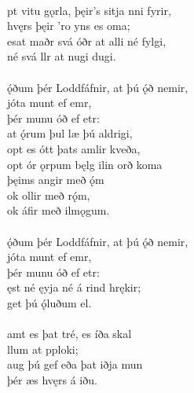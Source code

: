  \\

\bva {}pt vitu gǫrla, \hld þęir's sitja nni fyrir, \\%
\ind hvęrs þęir 'ro yns es oma; \\%
esat maðr svá óðr \hld at alli né fylgi, \\%
\ind né svá llr at nugi dugi.\\%

 \\

\bva {}ǫ́ðum þér Loddfáfnir, \hld at þú ǫ́ð nemir, \\%
\ind {}jóta munt ef emr, \\%
\ind þér munu óð ef etr: \\%
at ǫ́rum þul \hld {}læ þú aldrigi, \\%
\ind opt es ótt þats amlir kveða, \\%
opt ór ǫrpum bęlg \hld {}ilin orð koma \\%
\ind þęims angir með ǫ́m \\%
\ind ok ollir með rǫ́m, \\%
\ind ok áfir með ilmǫgum.\\%

 \\

\bva {}ǫ́ðum þér Loddfáfnir, \hld at þú ǫ́ð nemir, \\%
\ind {}jóta munt ef emr, \\%
\ind þér munu óð ef etr: \\%
ęst né ęyja \hld né á rind hrękir; \\%
\ind get þú ǫ́luðum el.\\%

 \\

\bva {}amt es þat tré, \hld es íða skal \\%
\ind {}llum at pploki; \\%
aug þú gef \hld eða þat iðja mun \\%
\ind þér æs hvęrs á iðu.\\%

 \\

